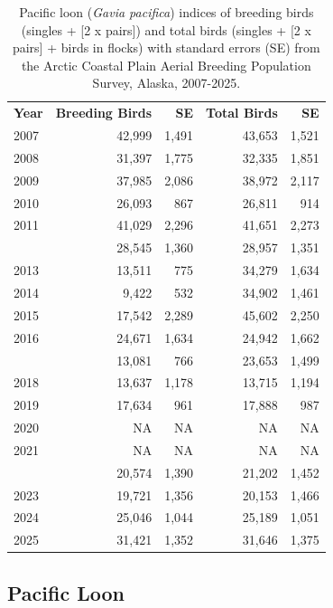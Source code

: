 \documentclass[
]{article}
\begin{document}
\begin{longtable}[t]{lrrrr}

\caption{\label{tbl-PALO}Pacific loon (\emph{Gavia pacifica}) indices of
breeding birds (singles + {[}2 x pairs{]}) and total birds (singles +
{[}2 x pairs{]} + birds in flocks) with standard errors (SE) from the
Arctic Coastal Plain Aerial Breeding Population Survey, Alaska,
2007-2025.}

\tabularnewline

\\
\toprule
\textbf{Year} & \textbf{Breeding Birds} & \textbf{SE} & \textbf{Total Birds} & \textbf{SE}\\
\midrule
2007 & 42,999 & 1,491 & 43,653 & 1,521\\
2008 & 31,397 & 1,775 & 32,335 & 1,851\\
2009 & 37,985 & 2,086 & 38,972 & 2,117\\
2010 & 26,093 & 867 & 26,811 & 914\\
2011 & 41,029 & 2,296 & 41,651 & 2,273\\
\addlinespace
2012 & 28,545 & 1,360 & 28,957 & 1,351\\
2013 & 13,511 & 775 & 34,279 & 1,634\\
2014 & 9,422 & 532 & 34,902 & 1,461\\
2015 & 17,542 & 2,289 & 45,602 & 2,250\\
2016 & 24,671 & 1,634 & 24,942 & 1,662\\
\addlinespace
2017 & 13,081 & 766 & 23,653 & 1,499\\
2018 & 13,637 & 1,178 & 13,715 & 1,194\\
2019 & 17,634 & 961 & 17,888 & 987\\
2020 & NA & NA & NA & NA\\
2021 & NA & NA & NA & NA\\
\addlinespace
2022 & 20,574 & 1,390 & 21,202 & 1,452\\
2023 & 19,721 & 1,356 & 20,153 & 1,466\\
2024 & 25,046 & 1,044 & 25,189 & 1,051\\
2025 & 31,421 & 1,352 & 31,646 & 1,375\\
\bottomrule

\end{longtable}

\endgroup{}

\newpage{}

\subsection*{Pacific Loon}\label{pacific-loon-2}
\end{document}
